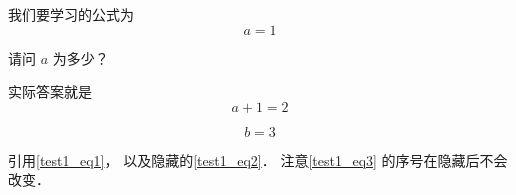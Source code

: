 
我们要学习的公式为
\begin{equation}\label{test1_eq1}
a = 1
\end{equation}

\begin{example}{}
请问 $a$ 为多少？
\pay

实际答案就是
\begin{equation}\label{test1_eq2}
a + 1 = 2
\end{equation}
\paid
\end{example}

\begin{equation}\label{test1_eq3}
b = 3
\end{equation}


引用\autoref{test1_eq1}， 以及隐藏的\autoref{test1_eq2}． 注意\autoref{test1_eq3} 的序号在隐藏后不会改变．
